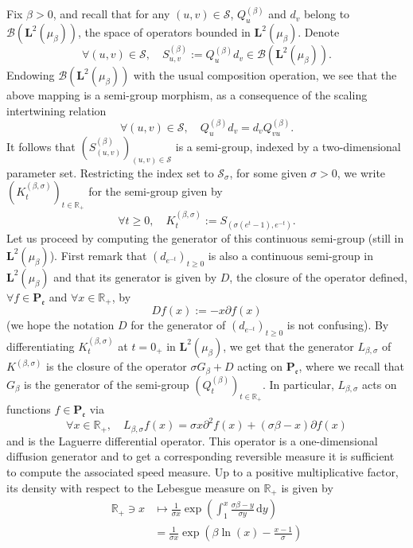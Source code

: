 \documentclass[10pt]{amsart}
\theoremstyle{definition}\newtheorem{defi}[theo]{Definition}\newtheorem{rema}[theo]{Remark}\newtheorem{exam}[theo]{Example}\newtheorem{exem}[theo]{Example}\newtheorem{nota}[theo]{Notation}
\newcommand{\df}{\mathrel{:=}}
\newcommand{\cB}{{\mathcal B}}
\newcommand{\cS}{{\mathcal S}}
\newcommand{\RR}{\mathbb{R}}
\newcommand{\fe}{\mathfrak{e}}
\newcommand{\lt}{\left}
\newcommand{\pa}{\partial}
\newcommand{\rt}{\right}
\newcommand{\esP}{\mathbf{P}}
\newcommand{\esL}{\mathbf{L}}
\newcommand{\esPe}{\esP_{\! \fe}}
\let\oldforall\forall
\renewcommand*{\forall}{\mathrel{\oldforall}}
\newcommand*{\dd}{\mathrm{d}}
\newcommand*{\dy}{\dd y}
\begin{document}
Fix $\beta>0$, and recall that for any $(u,v)\in\cS$, $Q^{(\beta)}_u$ and $d_v$ belong to $\cB(\esL^2(\mu_{\beta}))$, the space of operators bounded in $\esL^2(\mu_{\beta})$. Denote
\[
\forall (u,v)\in \cS,\quad S^{(\beta)}_{u,v}\df Q^{(\beta)}_ud_v \in \cB(\esL^2(\mu_{\beta})).
\]
Endowing $\cB(\esL^2(\mu_{\beta}))$ with the usual composition operation, we see that the above mapping is a semi-group morphism, as a consequence of the scaling intertwining relation
\begin{equation}\label{scal}
\forall (u,v)\in\cS,\quad Q^{(\beta)}_ud_v=d_vQ^{(\beta)}_{vu}.
\end{equation}
It follows that $(S^{(\beta)}_{(u,v)})_{(u,v)\in\cS}$ is a semi-group, indexed by a two-dimensional parameter set. Restricting the index set to $\cS_\sigma$, for some given $\sigma>0$, we write $(K^{(\beta,\sigma)}_t)_{t\in\RR_+}$ for the semi-group given by
\[
\forall t\geq 0,\quad K^{(\beta,\sigma)}_t\df S_{(\sigma(e^{t}-1),e^{-t})}.
\]
Let us proceed by computing the generator of this continuous semi-group (still in $\esL^2(\mu_{\beta})$). First remark that $(d_{e^{-t}})_{t\geq 0}$ is also a continuous semi-group in $\esL^2(\mu_{\beta})$ and that its generator is given by $D$, the closure of the operator defined, $\forall f\in \esPe$ and $\forall x\in\RR_+$, by
\begin{equation}\label{def:D}
D f(x)\df -x\pa f(x)
\end{equation}
(we hope the notation $D$ for the generator of $(d_{e^{-t}})_{t\geq 0}$ is not confusing). By differentiating $K^{(\beta,\sigma)}_t$ at $t=0_+$ in $\esL^2(\mu_{\beta})$, we get that the generator $L_{\beta,\sigma}$ of $K^{(\beta,\sigma)}$ is the closure of the operator $\sigma G_{\beta}+D$ acting on $\esPe$, where we recall that $G_{\beta}$ is the generator of the semi-group $(Q^{(\beta)}_t)_{t\in\RR_+}$. In particular, $L_{\beta,\sigma}$ acts on functions $f\in \esPe$ via
\begin{equation}\label{Lsigma}
\forall x\in\RR_+,\quad L_{\beta,\sigma}f(x)= \sigma x\pa^2f(x) +(\sigma\beta -x)\pa f(x)
\end{equation}
and is the Laguerre differential operator. This operator is a one-dimensional diffusion generator and to get a corresponding reversible measure it is sufficient to compute the associated speed measure. Up to a positive multiplicative factor, its density with respect to the Lebesgue measure on $\RR_+$ is given by
\begin{align*}
\RR_+\ni x&\mapsto \frac1{\sigma x}\exp\lt(\int_1^x \frac{\sigma\beta-y}{\sigma y}\, \dy\rt)\\
&=\frac1{\sigma x}\exp\lt(\beta \ln(x) -\frac{x-1}{\sigma }\rt)\\
\end{align*}
\end{document}
